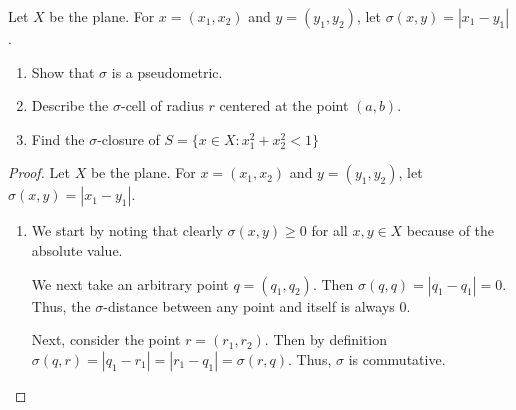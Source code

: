 \setcounter{question}{3} %
\begin{question}[Fasano]
  Let $X$ be the plane. For $x=(x_1,x_2)$ and $y=(y_1,y_{2})$, let $\sigma(x,y)=|x_1-y_1|$.
  \begin{enumerate}
  \item Show that $\sigma$ is a pseudometric.
  \item Describe the $\sigma$-cell of radius $r$ centered at the point $(a,b)$.
  \item Find the $\sigma$-closure of $S=\{ x \in X : x_1^2 + x_2^2 < 1 \}$
  \end{enumerate}
\end{question}

\begin{proof}
 Let $X$ be the plane. For $x=(x_1,x_2)$ and $y=(y_1,y_{2})$, let $\sigma(x,y)=|x_1-y_1|$.
\begin{enumerate}
    \item We start by noting that clearly $\sigma(x,y)\geq 0$ for all $x,y \in X$ because of the absolute value. 
    
    We next take an arbitrary point $q=(q_1,q_2)$. Then $\sigma(q,q)=|q_1-q_1|=0$. Thus, the $\sigma$-distance between any point and itself is always $0$. 
    
    Next, consider the point $r=(r_1,r_2)$. Then by definition $\sigma(q,r)=|q_1-r_1|=|r_1-q_1|=\sigma(r,q)$. Thus, $\sigma$ is commutative. 
    

\end{enumerate}
\end{proof}
